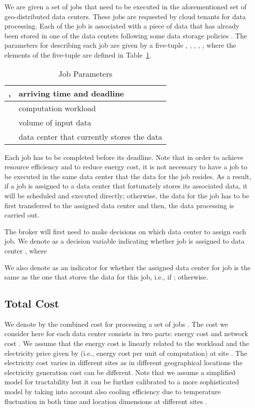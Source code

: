 \documentclass{article}
\begin{document}
We are given a set of  jobs  that need to be executed in the aforementioned set of geo-distributed data centers. These jobs are requested by cloud tenants for data processing. Each of the job is associated with a piece of data that has already been stored in one of the data centers following some data storage policies \cite{Liu-Storage-2015}. The parameters for describing each job  are given by a five-tuple , , , , , where the elements of the five-tuple are defined in Table~\ref{tb:notation}.
\begin{table}
\centering
\caption{\label{tb:notation}Job Parameters}
\begin{tabular}{c|l} \hline
	,  & arriving time and deadline\\ \hline
	 & computation workload \\ \hline
	 & volume of input data \\ \hline
	 & data center that currently stores the data \\
\hline\end{tabular}
\end{table}
Each job has to be completed before its deadline. Note that in order to achieve resource efficiency and to reduce energy cost, it is not necessary to have a job to be executed in the same data center that the data for the job resides. As a result, if a job is assigned to a data center that fortunately stores its associated data, it will be scheduled and executed directly; otherwise, the data for the job has to be first transferred to the assigned data center and then, the data processing is carried out. 

The broker will first need to make decisions on which data center to assign each job. We denote  as a decision variable indicating whether job  is assigned to data center , where

We also denote  as an indicator for whether the assigned data center  for job  is the same as the one  that stores the data for this job, i.e.,  if ;  otherwise.

\subsection{Total Cost}

We denote by  the combined cost for processing a set of jobs . The cost  we consider here for each data center  consists in two parts: energy cost  and network cost . We assume that the energy cost is linearly related to the workload and the electricity price given by  (i.e., energy cost per unit of computation) at site . The electricity cost varies in different sites as in different geographical locations the electricity generation cost can be different. Note that we assume a simplified model for tractability but it can be further calibrated to a more sophisticated model by taking into account also cooling efficiency due to temperature fluctuation in both time and location dimensions at different sites \cite{Xu-TPDS-2015}.
\end{document}
